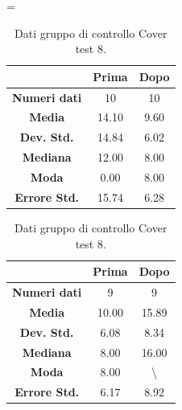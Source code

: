 \begin{table}
\centering
\setlength\tabcolsep{4pt}
\begin{minipage}{0.48\textwidth}
\centering
\tablewidth=\textwidth

\begin{tabular}{|c|c|c|} \hline
{\textbf{}} & {\textbf{  \hspace{8pt}Prima\hspace{8pt} }} & {\textbf{ \hspace{8pt}Dopo\hspace{8pt}  }}\\ \hline
\textbf{Numeri dati} & 10 & 10 \\ 
\textbf{Media} & 14.10 & 9.60 \\  
\textbf{Dev. Std.} & 14.84 & 6.02 \\  
\textbf{Mediana} & 12.00 & 8.00 \\ 
\textbf{Moda} & 0.00 & 8.00 \\ 
\textbf{Errore Std.} & 15.74 & 6.28 \\ 
\hline
\end{tabular}
\caption{Dati gruppo sperimentale Cover test 8.}

\label{tab:accuracy} 
\end{minipage}%
\hfill
\begin{minipage}{0.48\textwidth}
\centering

\begin{tabular}{|c|c|c|} \hline
{\textbf{}} & {\textbf{  \hspace{8pt}Prima\hspace{8pt} }} & {\textbf{ \hspace{8pt}Dopo\hspace{8pt}  }}\\ \hline
\textbf{Numeri dati} & 9 & 9 \\ 
\textbf{Media} & 10.00 & 15.89 \\  
\textbf{Dev. Std.} & 6.08 & 8.34 \\  
\textbf{Mediana} & 8.00 & 16.00 \\  
\textbf{Moda} & 8.00 & \textbackslash \\
\textbf{Errore Std.} & 6.17 & 8.92 \\
\hline
\end{tabular}
\caption{Dati gruppo di controllo Cover test 8.}

 \label{tab:ompdiff} 
\end{minipage}
\end{table}
